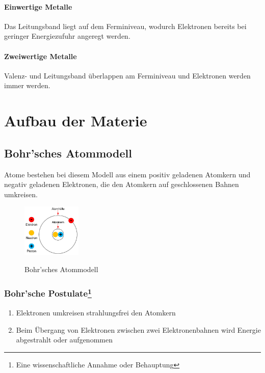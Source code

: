 \documentclass[a4paper,11pt]{article}
\begin{document}
\paragraph{Einwertige Metalle}
Das Leitungsband liegt auf dem Ferminiveau, wodurch Elektronen bereits bei geringer Energiezufuhr angeregt werden.
\paragraph{Zweiwertige Metalle}
Valenz- und Leitungsband überlappen am Ferminiveau und Elektronen werden immer werden.

\newpage
\section{Aufbau der Materie}
\subsection{Bohr'sches Atommodell}
Atome bestehen bei diesem Modell aus einem positiv geladenen Atomkern und negativ geladenen Elektronen, die den Atomkern auf geschlossenen Bahnen umkreisen.\cite{wikipedia-bohr}

\begin{figure}[!ht]
\centering
\includegraphics[width=0.25\textwidth]{einfaches-atommodell-a3.jpg}\\
\caption[https://www.sps-lehrgang.de/atommodelle/]{Bohr'sches Atommodell}
\end{figure}

\subsubsection[Bohr'sche Postulate]{Bohr'sche Postulate\protect\footnote{Eine wissenschaftliche Annahme oder Behauptung}}
\begin{enumerate}
    \item Elektronen umkreisen strahlungsfrei den Atomkern
    \item Beim Übergang von Elektronen zwischen zwei Elektronenbahnen wird Energie abgestrahlt oder aufgenommen
\end{enumerate}
\end{document}
